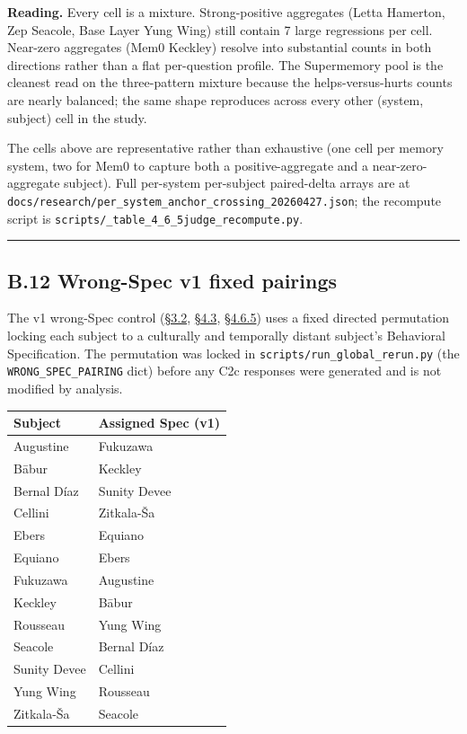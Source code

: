 \textbf{Reading.} Every cell is a mixture. Strong-positive aggregates
(Letta Hamerton, Zep Seacole, Base Layer Yung Wing) still contain 7
large regressions per cell. Near-zero aggregates (Mem0 Keckley) resolve
into substantial counts in both directions rather than a flat
per-question profile. The Supermemory pool is the cleanest read on the
three-pattern mixture because the helps-versus-hurts counts are nearly
balanced; the same shape reproduces across every other (system, subject)
cell in the study.

The cells above are representative rather than exhaustive (one cell per
memory system, two for Mem0 to capture both a positive-aggregate and a
near-zero-aggregate subject). Full per-system per-subject paired-delta
arrays are at
\texttt{docs/research/per\_system\_anchor\_crossing\_20260427.json}; the
recompute script is
\texttt{scripts/\_table\_4\_6\_5judge\_recompute.py}.

\begin{center}\rule{0.5\linewidth}{0.5pt}\end{center}

\hypertarget{b.12-wrong-spec-v1-fixed-pairings}{%
\subsection{B.12 Wrong-Spec v1 fixed
pairings}\label{b.12-wrong-spec-v1-fixed-pairings}}

The v1 wrong-Spec control (\hyperref[experimental-conditions]{§3.2}, \hyperref[mechanism-correct-content-not-format]{§4.3}, \hyperref[wrong-spec-derangement-protocol-sensitivity]{§4.6.5}) uses a fixed directed
permutation locking each subject to a culturally and temporally distant
subject's Behavioral Specification. The permutation was locked in
\texttt{scripts/run\_global\_rerun.py} (the
\texttt{WRONG\_SPEC\_PAIRING} dict) before any C2c responses were
generated and is not modified by analysis.

\begin{longtable}[]{@{}ll@{}}
\toprule
Subject & Assigned Spec (v1) \\
\midrule
\endhead
Augustine & Fukuzawa \\
Bābur & Keckley \\
Bernal Díaz & Sunity Devee \\
Cellini & Zitkala-Ša \\
Ebers & Equiano \\
Equiano & Ebers \\
Fukuzawa & Augustine \\
Keckley & Bābur \\
Rousseau & Yung Wing \\
Seacole & Bernal Díaz \\
Sunity Devee & Cellini \\
Yung Wing & Rousseau \\
Zitkala-Ša & Seacole \\
\bottomrule
\end{longtable}

